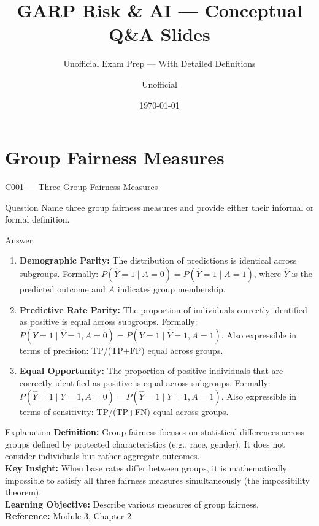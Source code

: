 \documentclass[aspectratio=169,8pt]{beamer}
\title[GARP RAI]{GARP Risk \& AI --- Conceptual Q\&A Slides}
\subtitle{Unofficial Exam Prep --- With Detailed Definitions}
\author{Unofficial}
\date{\today}
\begin{document}
	
	\begin{frame}
		\titlepage
	\end{frame}
	
	\section{Group Fairness Measures}
	
	\begin{frame}{C001 --- Three Group Fairness Measures}
		\begin{block}{Question}
			Name three group fairness measures and provide either their informal or formal definition.
		\end{block}
		\begin{block}{Answer}
			\begin{enumerate}
				\item \textbf{Demographic Parity:} The distribution of predictions is identical across subgroups. Formally: $P(\hat{Y}=1 \mid A=0) = P(\hat{Y}=1 \mid A=1)$, where $\hat{Y}$ is the predicted outcome and $A$ indicates group membership.\\
				\item \textbf{Predictive Rate Parity:} The proportion of individuals correctly identified as positive is equal across subgroups. Formally: $P(Y=1 \mid \hat{Y}=1, A=0) = P(Y=1 \mid \hat{Y}=1, A=1)$. Also expressible in terms of precision: TP/(TP+FP) equal across groups.\\
				\item \textbf{Equal Opportunity:} The proportion of positive individuals that are correctly identified as positive is equal across subgroups. Formally: $P(\hat{Y}=1 \mid Y=1, A=0) = P(\hat{Y}=1 \mid Y=1, A=1)$. Also expressible in terms of sensitivity: TP/(TP+FN) equal across groups.
			\end{enumerate}
		\end{block}
		\begin{block}{Explanation}
			\textbf{Definition:} Group fairness focuses on statistical differences across groups defined by protected characteristics (e.g., race, gender). It does not consider individuals but rather aggregate outcomes.\\
			\textbf{Key Insight:} When base rates differ between groups, it is mathematically impossible to satisfy all three fairness measures simultaneously (the impossibility theorem).\\
			\textbf{Learning Objective:} Describe various measures of group fairness.\\
			\textbf{Reference:} Module 3, Chapter 2
		\end{block}
	\end{frame}
	
\end{document}
